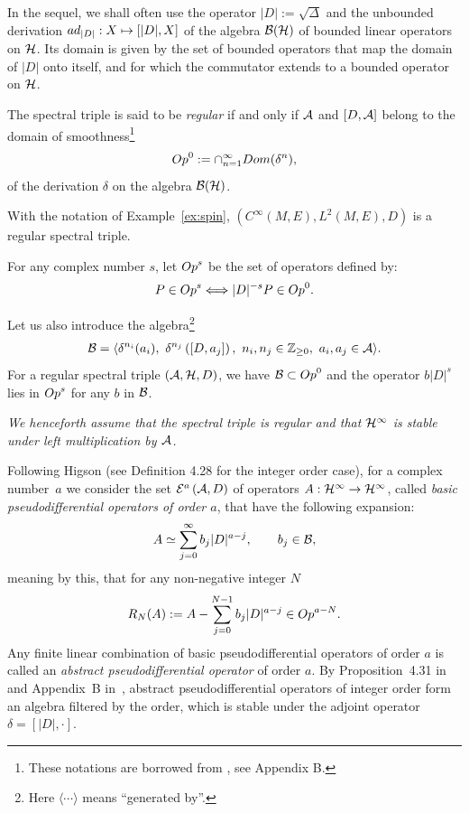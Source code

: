 \documentclass[11pt]{article}
\def \Z {\mathbb Z}
\def \Ci {{C^\infty}}
\numberwithin{equation}{section}
\begin{document}
  In the sequel, we shall often use the operator $\vert D\vert:= \sqrt{\Delta}$
  and  the unbounded derivation ${\rm ad}_{\vert D\vert}:
  X\mapsto [\vert D\vert, X]$ of the algebra  ${\cal B}({\cal H})$ of bounded
  linear operators on ${\cal H}$. Its
     domain is given by the set of bounded operators  that map the domain of
    $\vert D\vert$  onto itself, and for  which the commutator extends
    to a bounded operator on ${\cal H}$.

\begin{definition}
The spectral triple is said to be {\it regular} if and only if ${\cal A}$ and
$[D, {\cal A}]$ belong to the domain of smoothness\footnote{These notations are borrowed from \cite{CoMo},
  see Appendix B.}
  \[
  {\rm Op}^0:=\cap_{n=1}^\infty  {\rm Dom}(\delta^n),
   \]
   of the derivation $\delta$ on the algebra ${\cal B}({\cal H})$.
 \end{definition}

\begin{example}  With the notation of Example~\ref{ex:spin}, $\left(\Ci(M, E),
L^2(M, E), D\right)$ is a regular spectral triple.
\end{example}

For any complex number $s$, let ${\rm Op}^s$ be the set
of operators def\/ined by:
\[
P\in {\rm Op}^s \Longleftrightarrow \vert D\vert^{-s} P\in {\rm Op}^0 .
\]

Let us also introduce the  algebra\footnote{Here $\langle\cdots \rangle$
means ``generated by''.}
 \begin{gather*}%
 {\cal B}=
 \langle \delta^{n_i}(a_i),\  \delta^{n_j}\left([D, a_j]\right), \  n_i, n_j\in \Z_{\geq 0}, \  a_i, a_j\in {\cal
  A}\rangle.
  \end{gather*}
 For a regular spectral triple $({\cal A}, {\cal H}, D)$, we have ${\cal B}\subset {\rm Op}^0$
and  the operator $b  \vert D\vert^s$ lies in ${\rm Op}^s$ for any $b$
in ${\cal B}$.


{\it We henceforth assume that  the spectral triple is regular and that ${\cal H}^\infty$ is stable under left
multiplication by ${\cal A}$.}

Following Higson \cite{Hig} (see Def\/inition 4.28 for the integer order case), for a complex number~$a$ we consider the set
${\cal E}^a\left({\cal A},D\right)$ of
operators $A:{\cal H}^\infty\to {\cal H}^\infty$, called  {\it  basic pseudodif\/ferential operators of order
 $a$}, that have the following expansion:
\[
A\simeq \sum_{j=0}^\infty b_j \vert D\vert^{a-j}, \qquad b_j\in {\cal
  B},
\]
   meaning by this, that for any non-negative integer $N$
\[
R_N(A):=A-\sum_{j=0}^{N-1}  b_{j} \vert D\vert^{a-j} \in {\rm  Op}^{a -N}.
\]
Any f\/inite linear combination of basic pseudodif\/ferential operators of order
$a$  is called
an {\it  abstract pseudodif\/ferential operator} of  order $a $.
By Proposition~4.31 in~\cite{Hig}
and Appendix~B in~\cite{CoMo}, abstract pseudodif\/ferential operators of integer order form an
algebra f\/iltered by the order, which is stable under the adjoint operator
$\delta=[\vert D\vert, \cdot]$.
\end{document}
